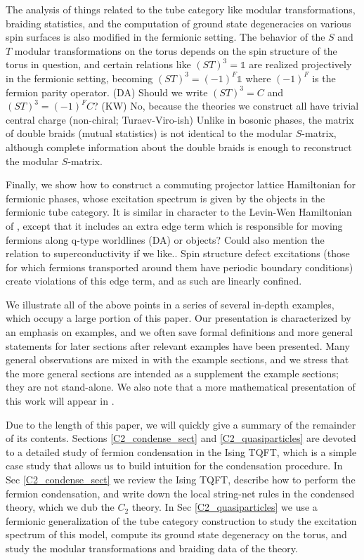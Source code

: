 \documentclass[12pt,a4paper]{article}
\newcommand{\unit}{\mathds{1}}
\newcommand{\kw}[1]{{\color{kwcolor}\footnotesize{(KW) #1}}}
\newcommand{\dave}[1]{{\color{ao(english)}\footnotesize{(DA) #1}}}
\begin{document}
The analysis of things related to the tube category like modular transformations, braiding statistics, and the computation of ground state degeneracies on various spin surfaces
is also modified in the fermionic setting.  
The behavior of the $S$ and $T$ modular transformations on the torus depends on the spin structure of the torus in question, and 
certain relations like $(ST)^3 = \unit$ are realized projectively in the fermionic setting, becoming 
$(ST)^3=(-1)^F\unit$ where $(-1)^F$ is the fermion parity operator.
\dave{Should we write $(ST)^3 = C$ and $(ST)^3 = (-1)^F C$?}
\kw{No, because the theories we construct all have trivial central charge (non-chiral; Turaev-Viro-ish)}
Unlike in bosonic phases, the matrix of double braids (mutual statistics) is not identical to the 
modular $S$-matrix, although complete information about the double braids 
is enough to reconstruct the modular $S$-matrix. 

Finally, we show how to construct a commuting projector lattice Hamiltonian 
for fermionic phases, whose excitation spectrum is given by the objects in the fermionic tube category.  
It is similar in character to the Levin-Wen Hamiltonian of \cite{}, 
except that it includes an extra edge term which is responsible for moving fermions along
q-type worldlines \dave{or objects?
Could also mention the relation to superconductivity if we like.}. 
Spin structure defect excitations (those for which fermions transported around them have periodic 
boundary conditions) create violations of this edge term, and as such are linearly confined. 

We illustrate all of the above points in a series of several in-depth examples, which occupy a large portion 
of this paper.
Our presentation is characterized by an emphasis on examples, 
and we often save formal definitions and more general statements 
for later sections after relevant examples have been presented.  
Many general observations are mixed in with the example sections,
and we stress that the more general sections are intended as a supplement
the example sections; they are not stand-alone.
We also note that a more mathematical presentation of this work will appear in \cite{Kevin and scott's paper?}. 


Due to the length of this paper, we will quickly give a summary of the remainder of its contents.
Sections \ref{C2_condense_sect} and \ref{C2_quasiparticles} are devoted to a detailed study of 
fermion condensation in the Ising TQFT, which is a simple case study that allows us to build intuition for the condensation procedure.
In Sec \ref{C2_condense_sect} we review the Ising TQFT, describe how to perform the 
fermion condensation, and write down the local string-net rules in the condensed theory, 
which we dub the $C_2$ theory. 
In Sec \ref{C2_quasiparticles} we use a fermionic generalization of the tube category 
construction to study the excitation spectrum of this model, compute its ground state 
degeneracy on the torus, and study the modular transformations and braiding data of 
the theory. 
\end{document}
